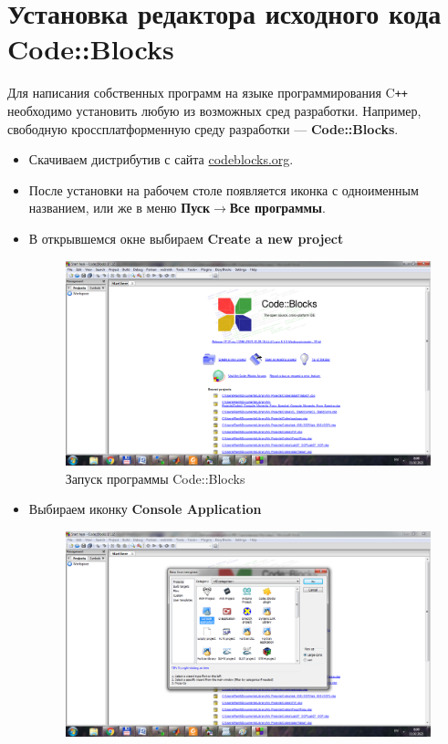 \chapter*{Установка редактора исходного кода Code::Blocks}
\renewcommand{\thefigure}{\arabic{figure}}

Для написания собственных программ на языке программирования C\texttt{++} необходимо установить любую из возможных сред разработки. Например, свободную кроссплатформенную среду разработки --- \textbf{Code::Blocks}.
\begin{itemize}
    \item Скачиваем дистрибутив с сайта {\color{Blue}\href{https://www.codeblocks.org/downloads/binaries/#imagesoswindows48pnglogo-microsoft-windows}{codeblocks.org}}.
    \item После установки на рабочем столе появляется иконка с одноименным названием, или же в меню \textbf{Пуск$\rightarrow$Все программы}.
    \item В открывшемся окне выбираем \textbf{Create a new project}
    \begin{figure}[H]
        \centering
        \includegraphics[width=.9\linewidth]{figures/CodeBlocks-1.png}
        \caption{Запуск программы Code::Blocks}
        \label{CodeBlocks-1}
    \end{figure}
    \item Выбираем иконку \textbf{Console Application}
    \begin{figure}[H]
        \centering
        \includegraphics[width=.9\linewidth]{figures/CodeBlocks-2.png}

\end{figure}
\end{itemize}
